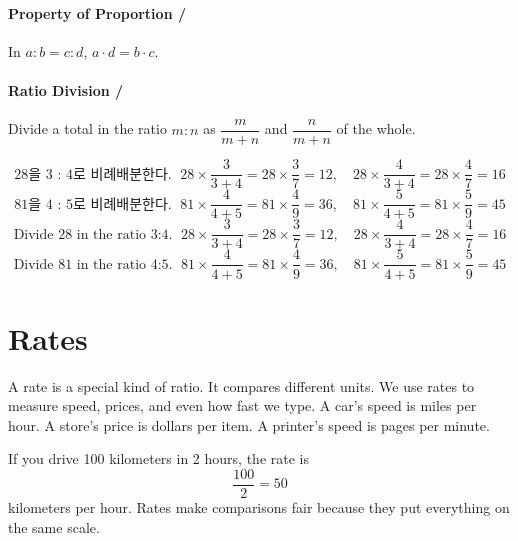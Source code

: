 \paragraph{Property of Proportion / }

In $a:b=c:d$, $a\cdot d=b\cdot c$.

\paragraph{Ratio Division / }

Divide a total in the ratio $m:n$ as $\dfrac{m}{m+n}$ and $\dfrac{n}{m+n}$ of the whole.

\[
\text{28을 3 : 4로 비례배분한다. } \; 28 \times \dfrac{3}{3+4} = 28 \times \dfrac{3}{7} = 12, 
\quad 28 \times \dfrac{4}{3+4} = 28 \times \dfrac{4}{7} = 16
\]
\[
\text{81을 4 : 5로 비례배분한다. } \; 81 \times \dfrac{4}{4+5} = 81 \times \dfrac{4}{9} = 36, 
\quad 81 \times \dfrac{5}{4+5} = 81 \times \dfrac{5}{9} = 45
\]
\[
\text{Divide 28 in the ratio 3:4. } \; 28 \times \dfrac{3}{3+4} = 28 \times \dfrac{3}{7} = 12, 
\quad 28 \times \dfrac{4}{3+4} = 28 \times \dfrac{4}{7} = 16
\]
\[
\text{Divide 81 in the ratio 4:5. } \; 81 \times \dfrac{4}{4+5} = 81 \times \dfrac{4}{9} = 36, 
\quad 81 \times \dfrac{5}{4+5} = 81 \times \dfrac{5}{9} = 45
\]






















\newpage
\section{Rates}

A rate is a special kind of ratio. It compares different units. We use rates to
measure speed, prices, and even how fast we type. A car's speed is miles per hour.
A store's price is dollars per item. A printer's speed is pages per minute.

If you drive 100 kilometers in 2 hours, the rate is
\[
\frac{100}{2}=50
\]
kilometers per hour. Rates make comparisons fair because they put everything on the
same scale.

